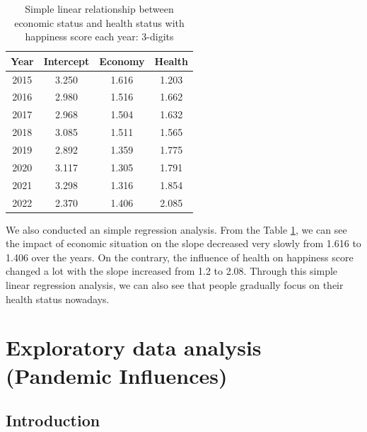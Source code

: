 \documentclass[11pt,a4paper,]{article}
\begin{document}
\newpage

\begin{table}
\centering
\begin{tabular}{|c|c|c|c|}
\hline
\textbf{Year} & \textbf{Intercept} & \textbf{Economy} & \textbf{Health} \\
\hline
2015          & 3.250              & 1.616            & 1.203           \\
2016          & 2.980              & 1.516            & 1.662           \\
2017          & 2.968              & 1.504            & 1.632           \\
2018          & 3.085              & 1.511            & 1.565           \\
2019          & 2.892              & 1.359            & 1.775           \\
2020          & 3.117              & 1.305            & 1.791           \\
2021          & 3.298              & 1.316            & 1.854           \\
2022          & 2.370              & 1.406            & 2.085           \\
\hline
\end{tabular}
\caption{Simple linear relationship between economic status and health status with happiness score each year: 3-digits}
\label{tab:table}
\end{table}

We also conducted an simple regression analysis. From the Table \ref{tab:table}, we can see the impact of economic situation on the slope decreased very slowly from 1.616 to 1.406 over the years. On the contrary, the influence of health on happiness score changed a lot with the slope increased from 1.2 to 2.08. Through this simple linear regression analysis, we can also see that people gradually focus on their health status nowadays.

\newpage

\hypertarget{exploratory-data-analysis-pandemic-influences}{%
\section{Exploratory data analysis (Pandemic Influences)}\label{exploratory-data-analysis-pandemic-influences}}

\hypertarget{introduction-1}{%
\subsection{Introduction}\label{introduction-1}}
\end{document}
